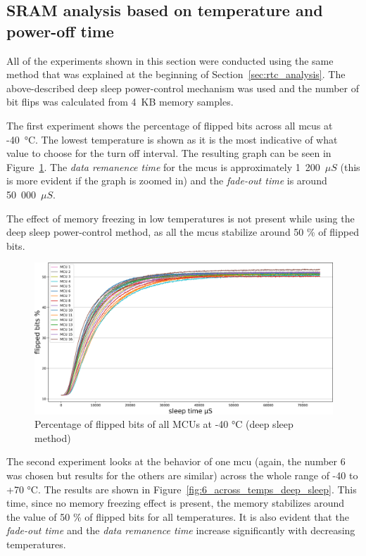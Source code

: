 \subsection{SRAM analysis based on temperature and power-off time}\label{sec:deep_sleep_analysis}

All of the experiments shown in this section were conducted using the same method that was explained at the beginning of Section~\ref{sec:rtc_analysis}. The above-described deep sleep power-control mechanism was used and the number of bit flips was calculated from 4~KB memory samples.

The first experiment shows the percentage of flipped bits across all \glspl{mcu} at -40~°C. The lowest temperature is shown as it is the most indicative of what value to choose for the turn off interval. The resulting graph can be seen in Figure~\ref{fig:all_minus_40_deep_sleep}. The \emph{data remanence time} for the \glspl{mcu} is approximately 1~200~$\mu{}S$ (this is more evident if the graph is zoomed in) and the \emph{fade-out time} is around 50~000~$\mu{}S$.

The effect of memory freezing in low temperatures is not present while using the deep sleep power-control method, as all the \glspl{mcu} stabilize around 50 \% of flipped bits.

\begin{figure}[ht!]
    \centering
    \captionsetup{justification=centering,margin=0.5cm}
    \includegraphics[width=\textwidth]{images/all_minus_40_deep_sleep.png}
    \caption{Percentage of flipped bits of all MCUs at -40 °C (deep sleep method)}
    \label{fig:all_minus_40_deep_sleep}
\end{figure}

The second experiment looks at the behavior of one \gls{mcu} (again, the number 6 was chosen but results for the others are similar) across the whole range of -40 to +70 °C. The results are shown in Figure~\ref{fig:6_across_temps_deep_sleep}. This time, since no memory freezing effect is present, the memory stabilizes around the value of 50 \% of flipped bits for all temperatures. It is also evident that the \emph{fade-out time} and the \emph{data remanence time} increase significantly with decreasing temperatures.


